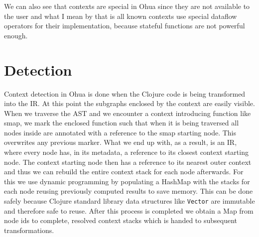 We can also see that contexts are special in Ohua since they are not available to the user and what I mean by that is all known contexts use special dataflow operators for their implementation, because stateful functions are not powerful enough.


\section{Detection}

Context detection in Ohua is done when the Clojure code is being transformed into the IR.
At this point the subgraphs enclosed by the context are easily visible.
When we traverse the AST and we encounter a context introducing function like smap, we mark the enclosed function such that when it is being traversed all nodes inside are annotated with a reference to the smap starting node.
This overwrites any previous marker.
What we end up with, as a result, is an IR, where every node has, in its metadata, a reference to its closest context starting node.
The context starting node then has a reference to its nearest outer context and thus we can rebuild the entire context stack for each node afterwards.
For this we use dynamic programming by populating a HashMap with the stacks for each node reusing previously computed results to save memory.
This can be done safely because Clojure standard library data structures like \texttt{Vector} are immutable and therefore safe to reuse.
After this process is completed we obtain a Map from node ids to complete, resolved context stacks which is handed to subsequent transformations.

